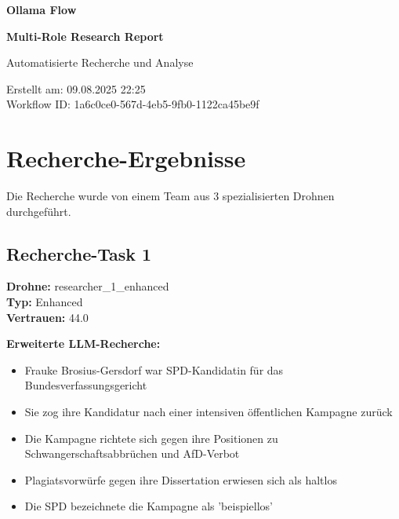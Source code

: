 \documentclass[12pt,a4paper]{article}
\begin{document}
\begin{titlepage}
    \centering
    
    \vspace*{2cm}
    
    {\Huge\bfseries Ollama Flow}
    
    {\Huge\bfseries Multi-Role Research Report}
    
    \vspace{2cm}
    
    {\Large Automatisierte Recherche und Analyse}
    
    \vspace{3cm}
    
    
    \vspace{2cm}
    
    
    \vfill
    
    {\large
    Erstellt am: 09.08.2025 22:25\\
    Workflow ID: 1a6c0ce0-567d-4eb5-9fb0-1122ca45be9f
    }
    
\end{titlepage}

\newpage
\tableofcontents
\newpage

\section{Recherche-Ergebnisse}

Die Recherche wurde von einem Team aus 3 spezialisierten Drohnen durchgeführt.

\subsection{Recherche-Task 1}

\textbf{Drohne:} researcher\_1\_enhanced\\
\textbf{Typ:} Enhanced\\
\textbf{Vertrauen:} 44.0%

\textbf{Erweiterte LLM-Recherche:}
\begin{itemize}
\item Frauke Brosius-Gersdorf war SPD-Kandidatin für das Bundesverfassungsgericht
\item Sie zog ihre Kandidatur nach einer intensiven öffentlichen Kampagne zurück
\item Die Kampagne richtete sich gegen ihre Positionen zu Schwangerschaftsabbrüchen und AfD-Verbot
\item Plagiatsvorwürfe gegen ihre Dissertation erwiesen sich als haltlos
\item Die SPD bezeichnete die Kampagne als 'beispiellos'
\end{itemize}
\end{document}
